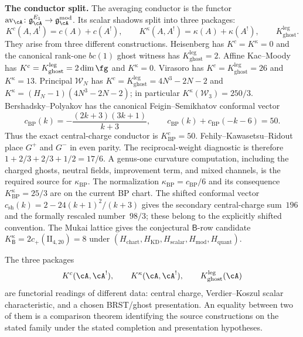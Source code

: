 \smallskip\noindent\textbf{The conductor split.}
The averaging conductor is the functor
$\mathrm{av}_\cA\colon\gAE\to\gAmod$. Its scalar shadows split into
three packages:
\[
K^c(A,A^!)=c(A)+c(A^!),\qquad
K^\kappa(A,A^!)=\kappa(A)+\kappa(A^!),\qquad
K_{\mathrm{ghost}}^{\mathrm{leg}} .
\]
They arise from three different constructions.  Heisenberg has $K^c=K^\kappa=0$ and the
canonical rank-one $bc(1)$ ghost witness has
$K_{\mathrm{ghost}}^{\mathrm{leg}}=2$. Affine Kac--Moody has
$K^c=K_{\mathrm{ghost}}^{\mathrm{leg}}=2\dim\fg$ and $K^\kappa=0$.
Virasoro has $K^c=K_{\mathrm{ghost}}^{\mathrm{leg}}=26$ and
$K^\kappa=13$. Principal $\mathcal W_N$ has
$K^c=K_{\mathrm{ghost}}^{\mathrm{leg}}=4N^3-2N-2$ and
$K^\kappa=(H_N-1)(4N^3-2N-2)$; in particular
$K^\kappa(\mathcal W_3)=250/3$. Bershadsky--Polyakov has
the canonical Feigin--Semikhatov conformal vector
\[
c_{\mathrm{BP}}(k)
=-\frac{(2k+3)(3k+1)}{k+3},
\qquad
c_{\mathrm{BP}}(k)+c_{\mathrm{BP}}(-k-6)=50.
\]
Thus the exact central-charge conductor is $K^c_{\mathrm{BP}}=50$.
Fehily--Kawasetsu--Ridout~\cite[Equation~(2.2)]{FKR20} place
$G^+$ and $G^-$ in even parity. The reciprocal-weight diagnostic is
therefore $1+2/3+2/3+1/2=17/6$. A genus-one curvature computation,
including the charged ghosts, neutral fields, improvement term, and
mixed channels, is the required source for $\kappa_{\mathrm{BP}}$. The
normalization $\kappa_{\mathrm{BP}}=c_{\mathrm{BP}}/6$ and its
consequence $K^\kappa_{\mathrm{BP}}=25/3$ are
\ClaimStatusConjectured{} on the current BP chart. The shifted conformal vector
$c_{\mathrm{sh}}(k)=2-24(k+1)^2/(k+3)$ gives the secondary
central-charge sum~$196$ and the formally rescaled number~$98/3$;
these belong to the explicitly shifted convention.  The Mukai lattice
gives the conjectural $\mathsf B$-row candidate
$K^\kappa_{\mathsf B}=2c_+(\mathrm{II}_{4,20})=8$ under
$(H_{\mathrm{chart}},H_{\mathrm{KD}},H_{\mathrm{scalar}},
H_{\mathrm{mod}},H_{\mathrm{quant}})$.

\begin{proposition}
\label{prop:intro-scalar-packages-not-formal}
The three packages
\[
K^c(\cA,\cA^!),\qquad
K^\kappa(\cA,\cA^!),\qquad
K_{\mathrm{ghost}}^{\mathrm{leg}}(\cA)
\]
are functorial readings of different data: central charge,
Verdier--Koszul scalar characteristic, and a chosen BRST/ghost
presentation.  An equality between two of them is a comparison theorem
identifying the source constructions on the stated family under the
stated completion and presentation hypotheses.
\end{proposition}

